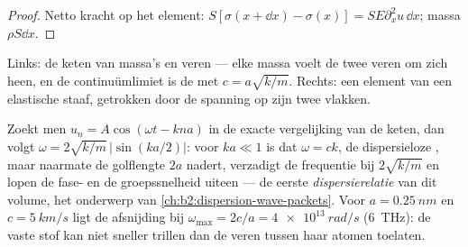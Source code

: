 \begin{proof}
Netto kracht op het element:
$S[\sigma(x + \dd x) - \sigma(x)] = SE\partial_x^2u\,\dd x$; massa
$\rho S\dd x$.
\end{proof}

\begin{omfigure}

{\small Links: de keten van massa's en veren --- elke massa voelt de twee
veren om zich heen, en de continuümlimiet is de  met
$c = a\sqrt{k/m}$. Rechts: een element van een elastische staaf, getrokken
door de spanning op zijn twee vlakken.}
\end{omfigure}

\begin{remark}\label{rem:b2:waves-on-strings:dispersion}
Zoekt men $u_n = A\cos(\omega t - kna)$ in de exacte vergelijking van de
keten, dan volgt $\omega = 2\sqrt{k/m}\,|\sin(ka/2)|$: voor $ka \ll 1$ is
dat $\omega = ck$, de dispersieloze , maar naarmate de
golflengte $2a$ nadert, verzadigt de frequentie bij $2\sqrt{k/m}$ en lopen
de fase- en de groepssnelheid uiteen --- de eerste \emph{dispersierelatie}
van dit volume, het onderwerp van \cref{ch:b2:dispersion-wave-packets}. Voor
$a = \qty{0.25}{nm}$ en $c = \qty{5}{km/s}$ ligt de afsnijding bij
$\omega_{\max} = 2c/a = \qty{4e13}{rad/s}$ (\qty{6}{THz}): de vaste stof kan
niet sneller trillen dan de veren tussen haar atomen toelaten.
\end{remark}

